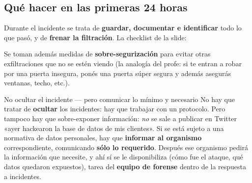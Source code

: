 \documentclass[11pt,a4paper]{article}
\begin{document}
\subsection{Qué hacer en las primeras 24 horas}

Durante el incidente se trata de \textbf{guardar, documentar e identificar} todo lo que pasó,
y de \textbf{frenar la filtración}. La checklist de la slide:

\begin{center}
\end{center}

\noindent Se toman además medidas de \textbf{sobre-segurización} para evitar otras
exfiltraciones que no se estén viendo (la analogía del profe: si te entran a robar por una
puerta insegura, ponés una puerta súper segura y además asegurás ventanas, techo, etc.).

\begin{warnbox}{No ocultar el incidente — pero comunicar lo mínimo y necesario}
No hay que tratar de \textbf{ocultar} los incidentes: hay que trabajar con un protocolo. Pero
tampoco hay que sobre-exponer información: \emph{no} se sale a publicar en Twitter «ayer
hackearon la base de datos de mis clientes». Si se está sujeto a una normativa de datos
personales, hay que \textbf{informar al organismo} correspondiente, comunicando \textbf{sólo
lo requerido}. Después ese organismo pedirá la información que necesite, y ahí sí se le
disponibiliza (cómo fue el ataque, qué datos quedaron expuestos), tarea del \textbf{equipo de
forense} dentro de la respuesta a incidentes.
\end{warnbox}
\end{document}
